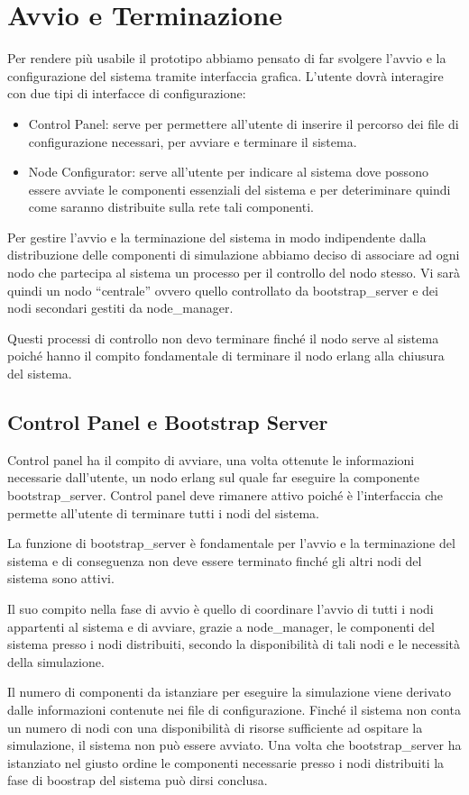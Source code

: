 \documentclass[11pt,a4paper]{report}
\begin{document}
\section{Avvio e Terminazione}
Per rendere più usabile il prototipo abbiamo pensato di far svolgere l'avvio e la configurazione del sistema tramite interfaccia grafica.
L'utente dovrà interagire con due tipi di interfacce di configurazione:
\begin{itemize}
\item Control Panel: serve per permettere all'utente di inserire il percorso dei file di configurazione necessari, per avviare e terminare il sistema.
\item Node Configurator: serve all'utente per indicare al sistema dove possono essere avviate le componenti essenziali del sistema e per deteriminare quindi come saranno distribuite sulla rete tali componenti.
\end{itemize}
Per gestire l'avvio e la terminazione del sistema in modo indipendente dalla distribuzione delle componenti di simulazione abbiamo deciso di associare ad ogni nodo che partecipa al sistema un processo per il controllo del nodo stesso. Vi sarà quindi un nodo ``centrale'' ovvero quello controllato da bootstrap\_server e dei nodi secondari gestiti da node\_manager.

Questi processi di controllo non devo terminare finché il nodo serve al sistema poiché hanno il compito fondamentale di terminare il nodo erlang alla chiusura del sistema.
\subsection*{Control Panel e Bootstrap Server}
Control panel ha il compito di avviare, una volta ottenute le informazioni necessarie dall'utente, un nodo erlang sul quale far eseguire la componente bootstrap\_server.
Control panel deve rimanere attivo poiché è l'interfaccia che permette all'utente di terminare tutti i nodi del sistema.

La funzione di bootstrap\_server è fondamentale per l'avvio e la terminazione del sistema e di conseguenza non deve essere terminato finché gli altri nodi del sistema sono attivi.

Il suo compito nella fase di avvio è quello di coordinare l'avvio di tutti i nodi appartenti al sistema e di avviare, grazie a node\_manager, le componenti del sistema presso i nodi distribuiti, secondo la disponibilità di tali nodi e le necessità della simulazione.

Il numero di componenti da istanziare per eseguire la simulazione viene derivato dalle informazioni contenute nei file di configurazione. Finché il sistema non conta un numero di nodi con una disponibilità di risorse sufficiente ad ospitare la simulazione, il sistema non può essere avviato.
Una volta che bootstrap\_server ha istanziato nel giusto ordine le componenti necessarie presso i nodi distribuiti la fase di boostrap del sistema può dirsi conclusa.
\end{document}
